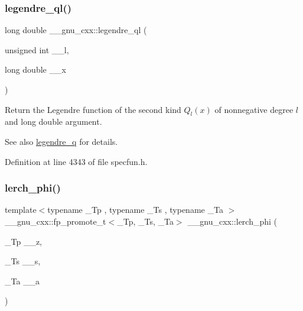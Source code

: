 \subsubsection{\texorpdfstring{legendre\+\_\+ql()}{legendre\_ql()}}
{\footnotesize\ttfamily long double \+\_\+\+\_\+gnu\+\_\+cxx\+::legendre\+\_\+ql (\begin{DoxyParamCaption}\item[{unsigned int}]{\+\_\+\+\_\+l,  }\item[{long double}]{\+\_\+\+\_\+x }\end{DoxyParamCaption})\hspace{0.3cm}{\ttfamily [inline]}}

Return the Legendre function of the second kind $ Q_l(x) $ of nonnegative degree $ l $ and {\ttfamily long double} argument.

\begin{DoxySeeAlso}{See also}
\hyperlink{group__gnu__math__spec__func_gadad5b22d0075dca31690907668af568f}{legendre\+\_\+q} for details. 
\end{DoxySeeAlso}


Definition at line 4343 of file specfun.\+h.

\mbox{\label{group__gnu__math__spec__func_ga31d7cfc601a99d72e58f654d0c890fd6}} 
\subsubsection{\texorpdfstring{lerch\+\_\+phi()}{lerch\_phi()}}
{\footnotesize\ttfamily template$<$typename \+\_\+\+Tp , typename \+\_\+\+Ts , typename \+\_\+\+Ta $>$ \\
\+\_\+\+\_\+gnu\+\_\+cxx\+::fp\+\_\+promote\+\_\+t$<$\+\_\+\+Tp, \+\_\+\+Ts, \+\_\+\+Ta$>$ \+\_\+\+\_\+gnu\+\_\+cxx\+::lerch\+\_\+phi (\begin{DoxyParamCaption}\item[{\+\_\+\+Tp}]{\+\_\+\+\_\+z,  }\item[{\+\_\+\+Ts}]{\+\_\+\+\_\+s,  }\item[{\+\_\+\+Ta}]{\+\_\+\+\_\+a }\end{DoxyParamCaption})\hspace{0.3cm}{\ttfamily [inline]}}

